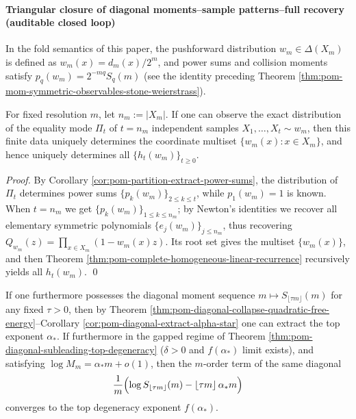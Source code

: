 \paragraph{Triangular closure of diagonal moments--sample patterns--full recovery (auditable closed loop)}
In the fold semantics of this paper, the pushforward distribution \(w_m\in\Delta(X_m)\) is defined as \(w_m(x)=d_m(x)/2^m\), and power sums and collision moments satisfy
\(
p_q(w_m)=2^{-mq}S_q(m)
\)
(see the identity preceding Theorem \ref{thm:pom-mom-symmetric-observables-stone-weierstrass}).

\begin{theorem}[Closed loop 1: finite-sample equality modes \texorpdfstring{$\Rightarrow$}{=>} full recovery curve]\label{thm:pom-closure-partition-to-full-recovery-curve}
For fixed resolution \(m\), let \(n_m:=|X_m|\).
If one can observe the exact distribution of the equality mode \(\Pi_t\) of \(t=n_m\) independent samples \(X_1,\dots,X_t\sim w_m\),
then this finite data uniquely determines the coordinate multiset \(\{w_m(x):x\in X_m\}\), and hence uniquely determines all \(\{h_t(w_m)\}_{t\ge0}\).
\end{theorem}
\begin{proof}
By Corollary \ref{cor:pom-partition-extract-power-sums}, the distribution of \(\Pi_t\) determines power sums \(\{p_k(w_m)\}_{2\le k\le t}\), while \(p_1(w_m)=1\) is known.
When \(t=n_m\) we get \(\{p_k(w_m)\}_{1\le k\le n_m}\); by Newton's identities we recover all elementary symmetric polynomials \(\{e_j(w_m)\}_{j\le n_m}\), thus recovering \(Q_{w_m}(z)=\prod_{x\in X_m}(1-w_m(x)z)\).
Its root set gives the multiset \(\{w_m(x)\}\), and then Theorem \ref{thm:pom-complete-homogeneous-linear-recurrence} recursively yields all \(h_t(w_m)\). \qed
\end{proof}

\begin{theorem}[Closed loop 2: diagonal moments \texorpdfstring{$\Rightarrow$}{=>} top spectrum]\label{thm:pom-closure-diagonal-to-top-spectrum}
If one furthermore possesses the diagonal moment sequence \(m\mapsto S_{\lfloor\tau m\rfloor}(m)\) for any fixed \(\tau>0\),
then by Theorem \ref{thm:pom-diagonal-collapse-quadratic-free-energy}--Corollary \ref{cor:pom-diagonal-extract-alpha-star} one can extract the top exponent \(\alpha_\ast\).
If furthermore in the gapped regime of Theorem \ref{thm:pom-diagonal-subleading-top-degeneracy} (\(\delta>0\) and \(f(\alpha_\ast)\) limit exists), and satisfying \(\log M_m=\alpha_\ast m+o(1)\),
then the \(m\)-order term of the same diagonal
\[
\frac{1}{m}\Bigl(\log S_{\lfloor\tau m\rfloor}(m)-\lfloor\tau m\rfloor\,\alpha_\ast m\Bigr)
\]
converges to the top degeneracy exponent \(f(\alpha_\ast)\).
\end{theorem}

\endinput
